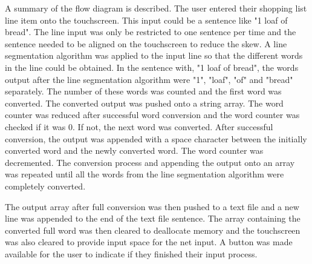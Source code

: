 A summary of the flow diagram is described. The user entered their shopping list line item onto the touchscreen. This input could be a sentence like "1 loaf of bread". The line input was only be restricted to one sentence per time and the sentence needed to be aligned on the touchscreen to reduce the skew. A line segmentation algorithm was applied to the input line so that the different words in the line could be obtained. In the sentence with, "1 loaf of bread", the words output after the line segmentation algorithm were "1", "loaf", "of" and "bread" separately. The number of these words was counted and the first word was converted. The converted output was pushed onto a string array. The word counter was reduced after successful word conversion and the word counter was checked if it was 0. If not, the next word was converted. After successful conversion, the output was appended with a space character between the initially converted word and the newly converted word. The word counter was decremented. The conversion process and appending the output onto an array was repeated until all the words from the line segmentation algorithm were completely converted. 

The output array after full conversion was then pushed to a text file and a new line was appended to the end of the text file sentence. The array containing the converted full word was then cleared to deallocate memory and the touchscreen was also cleared to provide input space for the net input. A button was made available for the user to indicate if they finished their input process.

